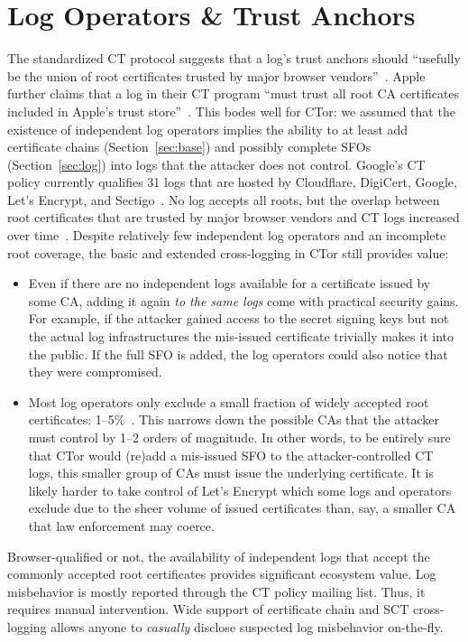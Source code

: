 \section{Log Operators \& Trust Anchors} \label{app:ct-trust-anchors}
The standardized CT protocol suggests that a log's trust anchors should
``usefully be the union of root certificates trusted by major browser
vendors''~\cite{ct,ct/bis}.  Apple further claims that a log in their CT program
``must trust all root CA certificates included in Apple's trust
store''~\cite{apple-log-policy}.  This bodes well for CTor:
	we assumed that the existence of independent log operators implies the
	ability to at least add certificate chains (Section~\ref{sec:base}) and
	possibly complete SFOs (Section~\ref{sec:log}) into logs that the attacker
	does not control.
Google's CT policy currently qualifies 31 logs that are hosted by
	Cloudflare,
	DigiCert,
	Google,
	Let's Encrypt, and
	Sectigo~\cite{google-log-policy}.
No log accepts all roots, but the overlap between root certificates that are
trusted by major browser vendors and CT logs increased over
time~\cite{ct-root-landscape}.  Despite relatively few independent log
operators and an incomplete root coverage, the basic and extended
cross-logging in CTor still provides value:
\begin{itemize}
	\item Even if there are no independent logs available for a certificate
		issued by some CA, adding it again \emph{to the same logs} come with
		practical security gains.  For example, if the attacker gained access to
		the secret signing keys but not the actual log infrastructures the
		mis-issued certificate trivially makes it into the public.  If the full
		SFO is added, the log operators could also notice that they were
		compromised.
	\item Most log operators only exclude a small fraction of widely accepted
		root certificates: 1--5\%~\cite{ct-root-landscape}.  This narrows down
		the possible CAs that the attacker must control by 1--2 orders of
		magnitude.  In other words, to be entirely sure that CTor would (re)add
		a mis-issued SFO to the attacker-controlled CT logs, this smaller group
		of CAs must issue the underlying certificate.  It is likely harder to
		take control of Let's Encrypt which some logs and operators exclude due
		to the sheer volume of issued certificates than, say, a smaller CA that
		law enforcement may coerce.
\end{itemize}

Browser-qualified or not, the availability of independent logs that accept the
commonly accepted root certificates provides significant ecosystem value.
Log misbehavior is mostly reported through the CT policy mailing list.  Thus, it
requires manual intervention.  Wide support of certificate chain and SCT
cross-logging allows anyone to \emph{casually} disclose suspected log
misbehavior on-the-fly.

